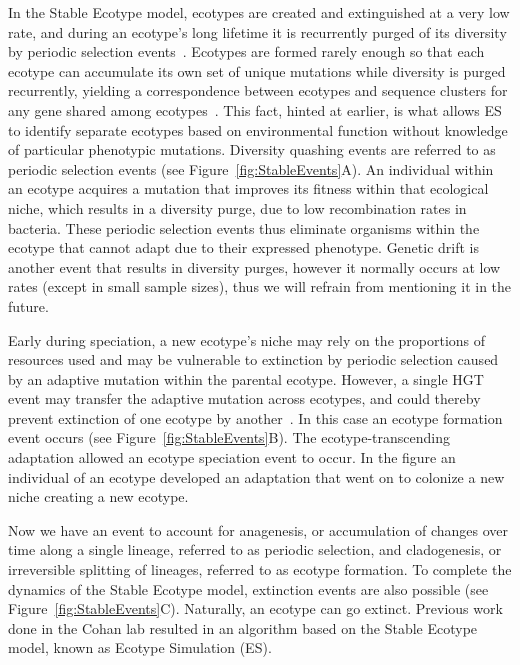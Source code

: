 In the Stable Ecotype model, ecotypes are created and extinguished at a very low rate, and during an ecotype's long lifetime it is recurrently purged of its diversity by periodic selection events~\cite{cohan2007systematics}.
Ecotypes are formed rarely enough so that each ecotype can accumulate its own set of unique mutations while diversity is purged recurrently, yielding a correspondence between ecotypes and sequence clusters for any gene shared among ecotypes~\cite{cohan2008origins}.
This fact, hinted at earlier, is what allows ES to identify separate ecotypes based on environmental function without knowledge of particular phenotypic mutations.
Diversity quashing events are referred to as periodic selection events (see Figure~\ref{fig:StableEvents}A).
An individual within an ecotype acquires a mutation that improves its fitness within that ecological niche, which results in a diversity purge, due to low recombination rates in bacteria.%
These periodic selection events thus eliminate organisms within the ecotype that cannot adapt due to their expressed phenotype.
Genetic drift is another event that results in diversity purges, however it normally occurs at low rates (except in small sample sizes), thus we will refrain from mentioning it in the future.

Early during speciation, a new ecotype's niche may rely on the proportions of resources used and may be vulnerable to extinction by periodic selection caused by an adaptive mutation within the parental ecotype.
However, a single HGT event may transfer the adaptive mutation across ecotypes, and could thereby prevent extinction of one ecotype by another~\cite{cohan2008origins}.
In this case an ecotype formation event occurs (see Figure~\ref{fig:StableEvents}B).
The ecotype-transcending adaptation allowed an ecotype speciation event to occur. In the figure an individual of an ecotype developed an adaptation that went on to colonize a new niche creating a new ecotype.

Now we have an event to account for anagenesis, or accumulation of changes over time along a single lineage, referred to as periodic selection, and cladogenesis, or irreversible splitting of lineages, referred to as ecotype formation.
To complete the dynamics of the Stable Ecotype model, extinction events are also possible (see Figure~\ref{fig:StableEvents}C).
Naturally, an ecotype can go extinct.
Previous work done in the Cohan lab resulted in an algorithm based on the Stable Ecotype model, known as Ecotype Simulation (ES).


